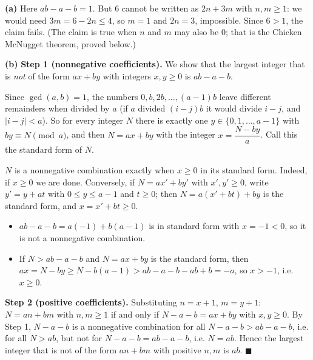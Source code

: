 \textbf{(a)} Here $ab-a-b=1$. But $6$ cannot be written as $2n+3m$ with $n,m\ge1$: we would need $3m=6-2n\le4$, so $m=1$ and $2n=3$, impossible. Since $6>1$, the claim fails. (The claim is true when $n$ and $m$ may also be $0$; that is the Chicken McNugget theorem, proved below.)

\textbf{(b)} \textbf{Step 1 (nonnegative coefficients).} We show that the largest integer that is \emph{not} of the form $ax+by$ with integers $x,y\ge0$ is $ab-a-b$.

Since $\gcd(a,b)=1$, the numbers $0,b,2b,\dots,(a-1)b$ leave different remainders when divided by $a$ (if $a$ divided $(i-j)b$ it would divide $i-j$, and $|i-j|<a$). So for every integer $N$ there is exactly one $y\in\{0,1,\dots,a-1\}$ with $by\equiv N\pmod a$, and then $N=ax+by$ with the integer $x=\dfrac{N-by}{a}$. Call this the standard form of $N$.

$N$ is a nonnegative combination exactly when $x\ge0$ in its standard form. Indeed, if $x\ge0$ we are done. Conversely, if $N=ax'+by'$ with $x',y'\ge0$, write $y'=y+at$ with $0\le y\le a-1$ and $t\ge0$; then $N=a(x'+bt)+by$ is the standard form, and $x=x'+bt\ge0$.
\begin{itemize}
\item $ab-a-b=a(-1)+b(a-1)$ is in standard form with $x=-1<0$, so it is not a nonnegative combination.
\item If $N>ab-a-b$ and $N=ax+by$ is the standard form, then $ax=N-by\ge N-b(a-1)>ab-a-b-ab+b=-a$, so $x>-1$, i.e. $x\ge0$.
\end{itemize}

\textbf{Step 2 (positive coefficients).} Substituting $n=x+1$, $m=y+1$: $N=an+bm$ with $n,m\ge1$ if and only if $N-a-b=ax+by$ with $x,y\ge0$. By Step 1, $N-a-b$ is a nonnegative combination for all $N-a-b>ab-a-b$, i.e. for all $N>ab$, but not for $N-a-b=ab-a-b$, i.e. $N=ab$. Hence the largest integer that is not of the form $an+bm$ with positive $n,m$ is $\boxed{ab}$. $\blacksquare$
